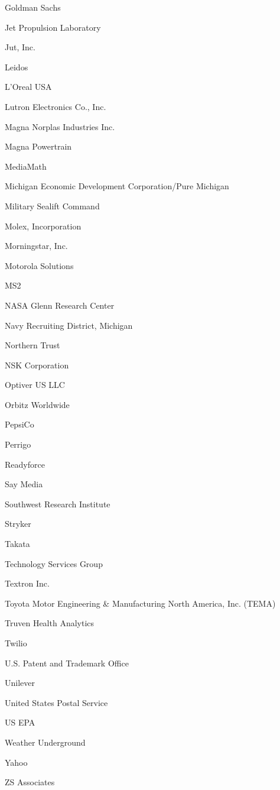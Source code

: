 \documentclass[twoside]{article}
\begin{document}
\begin{center}
\begin{multicols}{5}
\begin{FlushLeft}
\begin{compactitem}
\item Goldman Sachs
\item Jet Propulsion Laboratory
\item Jut, Inc.
\item Leidos
\item L'Oreal USA
\item Lutron Electronics Co., Inc.
\item Magna Norplas Industries Inc.
\item Magna Powertrain
\item MediaMath
\item Michigan Economic Development Corporation/Pure Michigan
\item Military Sealift Command
\item Molex, Incorporation
\item Morningstar, Inc.
\item Motorola Solutions
\item MS2
\item NASA Glenn Research Center
\item Navy Recruiting District, Michigan
\item Northern Trust
\item NSK Corporation
\item Optiver US LLC
\item Orbitz Worldwide
\item PepsiCo
\item Perrigo
\item Readyforce
\item Say Media
\item Southwest Research Institute
\item Stryker
\item Takata
\item Technology Services Group
\item Textron Inc.
\item Toyota Motor Engineering \& Manufacturing North America, Inc. (TEMA)
\item Truven Health Analytics
\item Twilio
\item U.S. Patent and Trademark Office
\item Unilever
\item United States Postal Service
\item US EPA
\item Weather Underground
\item Yahoo
\item ZS Associates

\end{compactitem}
\end{FlushLeft}
\end{multicols}
\end{center}
\end{document}
